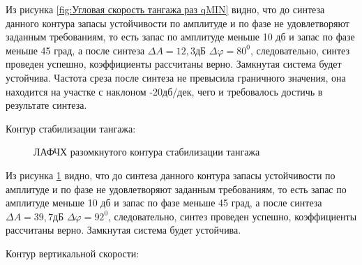 Из рисунка \ref{fig:Угловая скорость тангажа раз qMIN} видно, что до синтеза данного контура запасы устойчивости по амплитуде и по фазе не удовлетворяют заданным требованиям, то есть запас по амплитуде меньше 10 дб и запас по фазе меньше 45 град, а после синтеза $\Delta A = 12,3$дБ $\Delta \varphi = 80^0$, следовательно, синтез проведен успешно, коэффициенты рассчитаны верно. Замкнутая система будет устойчива. Частота среза после синтеза не превысила граничного значения, она находится на участке с наклоном -20дб/дек, чего и требовалось достичь в результате синтеза.  

\begin{center}
    Контур стабилизации тангажа:
\end{center}

\begin{figure}[H]
    \caption{ЛАФЧХ разомкнутого контура стабилизации тангажа}
    \label{fig:Тангаж раз qMIN}
\end{figure}

Из рисунка \ref{fig:Тангаж раз qMIN} видно, что до синтеза данного контура запасы устойчивости по амплитуде и по фазе не удовлетворяют заданным требованиям, то есть запас по амплитуде меньше 10 дб и запас по фазе меньше 45 град, а после синтеза $\Delta A = 39,7 $дБ $\Delta \varphi = 92^0$, следовательно, синтез проведен успешно, коэффициенты рассчитаны верно. Замкнутая система будет устойчива.  

\begin{center}
    Контур вертикальной скорости:
\end{center}


